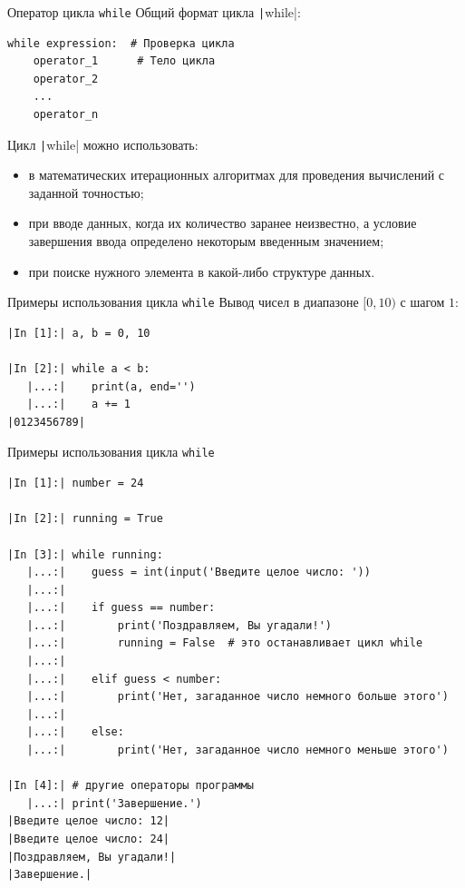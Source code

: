\documentclass[aspectratio=169]{beamer}	%
\begin{document}
\begin{frame}[fragile]{Оператор цикла \texttt{while}}
\scriptsize
Общий формат цикла \texttt|while|: 

\begin{verbatim}
while expression:  # Проверка цикла
    operator_1      # Тело цикла
    operator_2
    ...
    operator_n
\end{verbatim}
Цикл \texttt|while| можно использовать:
\begin{itemize}
	\item  в математических итерационных алгоритмах для проведения вычислений с заданной точностью;
	\item  при вводе данных, когда их количество заранее неизвестно, а условие завершения ввода определено некоторым введенным значением;
	\item при поиске нужного элемента в какой-либо структуре данных.
\end{itemize}
\vfill
\end{frame}



\begin{frame}[fragile]{Примеры использования цикла \texttt{while}}
\scriptsize
Вывод чисел в диапазоне $[0, 10)$ с шагом $1$:

\begin{verbatim}
|In [1]:| a, b = 0, 10

|In [2]:| while a < b:
   |...:|    print(a, end='')
   |...:|    a += 1
|0123456789|
\end{verbatim}
\vfill
\end{frame}


\begin{frame}[fragile]{Примеры использования цикла \texttt{while}}
\scriptsize
\begin{verbatim}
|In [1]:| number = 24

|In [2]:| running = True

|In [3]:| while running:
   |...:|    guess = int(input('Введите целое число: ')) 
   |...:| 
   |...:|    if guess == number:
   |...:|        print('Поздравляем, Вы угадали!')
   |...:|        running = False  # это останавливает цикл while
   |...:| 
   |...:|    elif guess < number:
   |...:|        print('Нет, загаданное число немного больше этого')
   |...:| 
   |...:|    else:
   |...:|        print('Нет, загаданное число немного меньше этого')

|In [4]:| # другие операторы программы
   |...:| print('Завершение.')
|Введите целое число: 12|
|Введите целое число: 24|
|Поздравляем, Вы угадали!|
|Завершение.| 
\end{verbatim}
\vfill
\end{frame}
\end{document}
